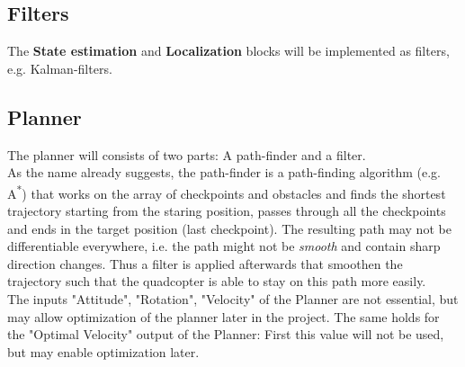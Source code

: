 \documentclass[a4paper,footsepline]{scrartcl}
\begin{document}
\subsection*{Filters}
The \textbf{State estimation} and \textbf{Localization} blocks will be implemented as filters, e.g. Kalman-filters.
\subsection*{Planner}
The planner will consists of two parts: A path-finder and a filter.\\
As the name already suggests, the path-finder is a path-finding algorithm (e.g. A\textsuperscript{*}) that works on the array of checkpoints and obstacles and finds the shortest trajectory starting from the staring position, passes through all the checkpoints and ends in the target position (last checkpoint). The resulting path may not be differentiable everywhere, i.e. the path might not be \emph{smooth} and contain sharp direction changes. Thus a filter is applied afterwards that smoothen the trajectory such that the quadcopter is able to stay on this path more easily.
\vspace{0.2cm}\\
The inputs "Attitude", "Rotation", "Velocity" of the Planner are not essential, but may allow optimization of the planner later in the project.
The same holds for the "Optimal Velocity" output of the Planner: First this value will not be used, but may enable optimization later.
\end{document}
